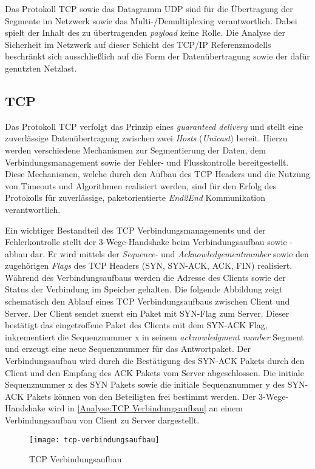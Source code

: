 Das Protokoll \ac{TCP} sowie das Datagramm \ac{UDP} sind für die Übertragung der Segmente im Netzwerk sowie das Multi-/Demultiplexing verantwortlich. Dabei spielt der Inhalt des zu übertragenden \textit{payload} keine Rolle. Die Analyse der Sicherheit im Netzwerk auf dieser Schicht des \ac{TCP}/\ac{IP} Referenzmodells beschränkt sich ausschließlich auf die Form der Datenübertragung sowie der dafür genutzten Netzlast.

\subsection{\ac{TCP}}
\label{Analyse:TCP}
Das Protokoll \ac{TCP} verfolgt das Prinzip eines \textit{guaranteed delivery} und stellt eine zuverlässige Datenübertragung zwischen zwei \textit{Hosts} (\textit{Unicast}) bereit. Hierzu werden verschiedene Mechanismen zur Segmentierung der Daten, dem Verbindungsmanagement sowie der Fehler- und Flusskontrolle bereitgestellt. Diese Mechanismen, welche durch den Aufbau des \ac{TCP} Headers und die Nutzung von Timeouts und Algorithmen realisiert werden, sind für den Erfolg des Protokolls für zuverlässige, paketorientierte \textit{End2End} Kommunikation verantwortlich.

Ein wichtiger Bestandteil des \ac{TCP} Verbindungsmanagements und der Fehlerkontrolle stellt der 3-Wege-Handshake beim Verbindungsaufbau sowie -abbau dar. Er wird mittels der \textit{Sequence-} und \textit{Acknowledgementnumber} sowie den zugehörigen \textit{Flags} des \ac{TCP} Headers (\ac{SYN}, \ac{SYN-ACK}, \ac{ACK}, \ac{FIN}) realisiert. Während des Verbindungsaufbaus werden die Adresse des Clients sowie der Status der Verbindung im Speicher gehalten. Die folgende Abbildung zeigt schematisch den Ablauf eines \ac{TCP} Verbindungsaufbaus zwischen Client und Server. Der Client sendet zuerst ein Paket mit SYN-Flag zum Server. Dieser bestätigt das eingetroffene Paket des Clients mit dem SYN-ACK Flag, inkrementiert die Sequenznummer x in seinem \textit{acknowledgment number} Segment und erzeugt eine neue Sequenznummer für das Antwortpaket. Der Verbindungsaufbau wird durch die Bestätigung des SYN-ACK Pakets durch den Client und den Empfang des ACK Pakets vom Server abgeschlossen. Die initiale Sequenznummer x des SYN Pakets sowie die initiale Sequenznummer y des SYN-ACK Pakets können von den Beteiligten frei bestimmt werden. Der 3-Wege-Handshake wird in \autoref{Analyse:TCP Verbindungsaufbau} an einem Verbindungsaufbau von Client zu Server dargestellt.

\begin{figure}[h]
    \centering
    \texttt{[image: tcp-verbindungsaufbau]}
    \caption{TCP Verbindungsaufbau}
    \label{Analyse:TCP Verbindungsaufbau}
\end{figure}

